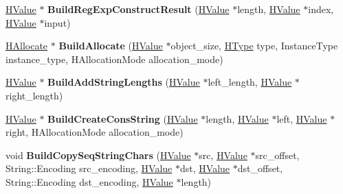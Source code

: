\begin{DoxyCompactItemize}
\item 
\hyperlink{classv8_1_1internal_1_1_h_value}{H\+Value} $\ast$ {\bfseries Build\+Reg\+Exp\+Construct\+Result} (\hyperlink{classv8_1_1internal_1_1_h_value}{H\+Value} $\ast$length, \hyperlink{classv8_1_1internal_1_1_h_value}{H\+Value} $\ast$index, \hyperlink{classv8_1_1internal_1_1_h_value}{H\+Value} $\ast$input)\hypertarget{classv8_1_1internal_1_1_h_graph_builder_a75be3c6b0d898152e46a0301ab37342d}{}\label{classv8_1_1internal_1_1_h_graph_builder_a75be3c6b0d898152e46a0301ab37342d}

\item 
\hyperlink{classv8_1_1internal_1_1_h_allocate}{H\+Allocate} $\ast$ {\bfseries Build\+Allocate} (\hyperlink{classv8_1_1internal_1_1_h_value}{H\+Value} $\ast$object\+\_\+size, \hyperlink{classv8_1_1internal_1_1_h_type}{H\+Type} type, Instance\+Type instance\+\_\+type, H\+Allocation\+Mode allocation\+\_\+mode)\hypertarget{classv8_1_1internal_1_1_h_graph_builder_a64ee0a1ef120b9a1f863ae7f6f6ede4d}{}\label{classv8_1_1internal_1_1_h_graph_builder_a64ee0a1ef120b9a1f863ae7f6f6ede4d}

\item 
\hyperlink{classv8_1_1internal_1_1_h_value}{H\+Value} $\ast$ {\bfseries Build\+Add\+String\+Lengths} (\hyperlink{classv8_1_1internal_1_1_h_value}{H\+Value} $\ast$left\+\_\+length, \hyperlink{classv8_1_1internal_1_1_h_value}{H\+Value} $\ast$right\+\_\+length)\hypertarget{classv8_1_1internal_1_1_h_graph_builder_a3447849b5059e96a3bd9a260dbda1bb2}{}\label{classv8_1_1internal_1_1_h_graph_builder_a3447849b5059e96a3bd9a260dbda1bb2}

\item 
\hyperlink{classv8_1_1internal_1_1_h_value}{H\+Value} $\ast$ {\bfseries Build\+Create\+Cons\+String} (\hyperlink{classv8_1_1internal_1_1_h_value}{H\+Value} $\ast$length, \hyperlink{classv8_1_1internal_1_1_h_value}{H\+Value} $\ast$left, \hyperlink{classv8_1_1internal_1_1_h_value}{H\+Value} $\ast$right, H\+Allocation\+Mode allocation\+\_\+mode)\hypertarget{classv8_1_1internal_1_1_h_graph_builder_a3c3834187bd8b281f39a9722ac424d12}{}\label{classv8_1_1internal_1_1_h_graph_builder_a3c3834187bd8b281f39a9722ac424d12}

\item 
void {\bfseries Build\+Copy\+Seq\+String\+Chars} (\hyperlink{classv8_1_1internal_1_1_h_value}{H\+Value} $\ast$src, \hyperlink{classv8_1_1internal_1_1_h_value}{H\+Value} $\ast$src\+\_\+offset, String\+::\+Encoding src\+\_\+encoding, \hyperlink{classv8_1_1internal_1_1_h_value}{H\+Value} $\ast$dst, \hyperlink{classv8_1_1internal_1_1_h_value}{H\+Value} $\ast$dst\+\_\+offset, String\+::\+Encoding dst\+\_\+encoding, \hyperlink{classv8_1_1internal_1_1_h_value}{H\+Value} $\ast$length)\hypertarget{classv8_1_1internal_1_1_h_graph_builder_a91159ab1a4e2532eec8ac03e445fe25b}{}\label{classv8_1_1internal_1_1_h_graph_builder_a91159ab1a4e2532eec8ac03e445fe25b}


\end{DoxyCompactItemize}

